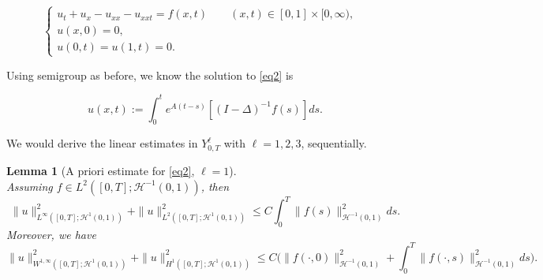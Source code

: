 \documentclass[10pt,a4paper,final]{article}
\numberwithin{equation}{section}
\newtheorem{lemma}[theorem]{Lemma}
\newcommand{\cH}{\mathcal{H}}
\begin{document}
\begin{equation} \label{eq2}
\begin{cases}
    u_t+u_x-u_{xx}-u_{xxt}=f(x,t) \quad\quad (x,t)\in [0,1]\times [0, \infty),&\\
    u(x,0)=0, &\\
    u(0,t)=u(1,t)=0. &
\end{cases}
\end{equation}

Using semigroup as before, we know the solution to \eqref{eq2} is

$$u(x,t):=\int_0^te^{A(t-s)}[(I-\Delta)^{-1}f(s)]ds.$$

 We would derive the linear estimates in $Y^\ell_{0, T}$ with $\ell=1, 2, 3$, sequentially.\\

\begin{lemma}[A priori estimate for \eqref{eq2}, $\ell=1$]\ \label{apri2l1} \\
Assuming $f\in L^2([0,T];\cH^{-1}(0,1))$, then 
   $$ \|u\|_{L^{\infty}([0,T];\cH^1(0,1))}^2+\|u\|_{L^{2}([0,T];\cH^1(0,1))}^2\leq  C\int_0^T\|f(s)\|^2_{\cH^{-1}(0,1)}ds. $$
   Moreover, we have 
   $$ \|u\|_{W^{1,\infty}([0,T];\cH^1(0,1))}^2+\|u\|_{H^{1}([0,T];\cH^1(0,1))}^2\leq  C\bigg(\|f(\cdot,0)\|_{\cH^{-1}(0,1)}^2+\int_0^T\|f(\cdot,s)\|^2_{\cH^{-1}(0,1)}ds\bigg). $$
\end{lemma}
\end{document}
